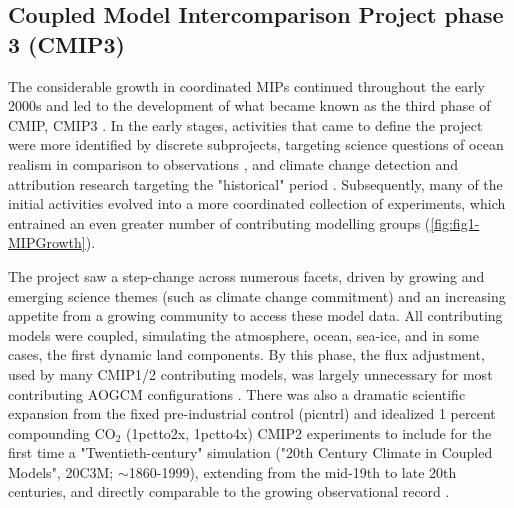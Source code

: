 \documentclass[manuscript]{copernicus}
\newcommand{\mycomment}[1]{}
\begin{document}
\subsection{Coupled Model Intercomparison Project phase 3 (CMIP3)}
\label{sec:cmip3}
\mycomment{
Dave B 241120: the CMIP3 section understates the transformational data availability and distribution change.
Susan Solomon, WGI head, asked WGCM chairs John Mitchell and ?? (maybe J. Meehl) to prepare an archive of standard model experiments for use by the, and this is critical, the WG1 community. As you would have expected, WGCM then asked PCMDI to take the lead. After talking to Dean, I responded “yes” with two requirements – the data needed to be in a standardized format before being sent to PCMDI, and the users were expected to be familiar with the data and its format.
Before CMIP3, output format standardization (Karl and Peter G.) and setting up the ESGF data server to have all CMIP3 data online and in one place (Dean, Bob, and Jenny) were not done in AMIP or CMIP. 
The WGCM’s best guess was that 50 users would access the data, and the data volume would be $\sim$17 TBytes. You know the rest of the story.
}

The considerable growth in coordinated MIPs continued throughout the early 2000s and led to the development of what became known as the third phase of CMIP, CMIP3 \citep{meehl_wcrp_2007}. In the early stages, activities that came to define the project were more identified by discrete subprojects, targeting science questions of ocean realism in comparison to observations \citep[e.g.,][]{orr_ocean_1999, dutay_evaluation_2002,dutay_evaluation_2004}, and climate change detection and attribution research targeting the "historical" period \citep[e.g.,][]{hegerl_20c3m_2003}. Subsequently, many of the initial activities evolved into a more coordinated collection of experiments, which entrained an even greater number of contributing modelling groups (\autoref{fig:fig1-MIPGrowth}).

The project saw a step-change across numerous facets, driven by growing and emerging science themes (such as climate change commitment) and an increasing appetite from a growing community to access these model data. All contributing models were coupled, simulating the atmosphere, ocean, sea-ice, and in some cases, the first dynamic land components. By this phase, the flux adjustment, used by many CMIP1/2 contributing models, was largely unnecessary for most contributing AOGCM configurations \citep{durack_ocean_2012}. There was also a dramatic scientific expansion from the fixed pre-industrial control (picntrl) and idealized 1 percent compounding CO$_{2}$ (1pctto2x, 1pctto4x) CMIP2 experiments to include for the first time a "Twentieth-century" simulation ("20th Century Climate in Coupled Models", 20C3M; $\sim$1860-1999), extending from the mid-19th to late 20th centuries, and directly comparable to the growing observational record \citep[][\autoref{tab:tabAppA1-MIPExperiments}]{meehl_wcrp_2007}.
\end{document}
